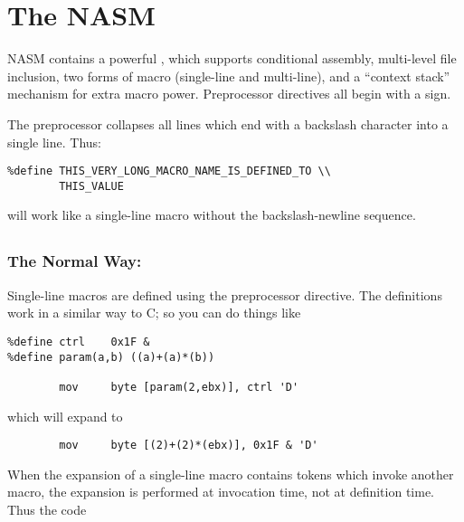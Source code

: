 \chapter{The NASM }
\label{ch:preproc}

NASM contains a powerful , which supports
conditional assembly, multi-level file inclusion, two forms of macro
(single-line and multi-line), and a ``context stack'' mechanism for
extra macro power. Preprocessor directives all begin with a \code{\%}
sign.

The preprocessor collapses all lines which end with a backslash
\code{\textbackslash\textbackslash} character into a single line.
Thus:

\begin{lstlisting}
%define THIS_VERY_LONG_MACRO_NAME_IS_DEFINED_TO \\
        THIS_VALUE
\end{lstlisting}

will work like a single-line macro without the backslash-newline
sequence.

\section{}
\label{sec:slmacro}

\subsection{The Normal Way: }
\label{subsec:define}

Single-line macros are defined using the  preprocessor
directive. The definitions work in a similar way to C; so you can do
things like

\begin{lstlisting}
%define ctrl    0x1F &
%define param(a,b) ((a)+(a)*(b))

        mov     byte [param(2,ebx)], ctrl 'D'
\end{lstlisting}

which will expand to

\begin{lstlisting}
        mov     byte [(2)+(2)*(ebx)], 0x1F & 'D'
\end{lstlisting}

When the expansion of a single-line macro contains tokens which
invoke another macro, the expansion is performed at invocation time,
not at definition time. Thus the code

